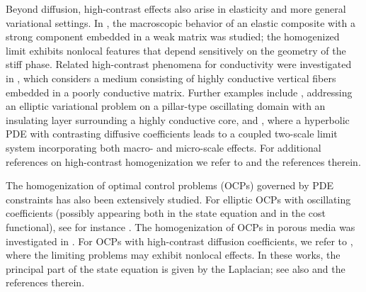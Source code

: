 \documentclass[11pt,a4paper]{article}
\numberwithin{equation}{section}
\begin{document}
Beyond diffusion, high-contrast effects also arise in elasticity and more general variational settings. In \cite{MR1952924}, the macroscopic behavior of an elastic composite with a strong component embedded in a weak matrix was studied; the homogenized limit exhibits nonlocal features that depend sensitively on the geometry of the stiff phase. Related high-contrast phenomena for conductivity were investigated in \cite{MR3000657}, which considers a medium consisting of highly conductive vertical fibers embedded in a poorly conductive matrix. Further examples include \cite{MR3342695}, addressing an elliptic variational problem on a pillar-type oscillating domain with an insulating layer surrounding a highly conductive core, and \cite{MR3450748}, where a hyperbolic PDE with contrasting diffusive coefficients leads to a coupled two-scale limit system incorporating both macro- and micro-scale effects. For additional references on high-contrast homogenization we refer to \cite{gaudiello2021limit,briane2007homogenization,MR3251918} and the references therein.

The homogenization of optimal control problems (OCPs) governed by PDE constraints has also been extensively studied. For elliptic OCPs with oscillating coefficients (possibly appearing both in the state equation and in the cost functional), see for instance \cite{MR1466916,MR451153}. The homogenization of OCPs in porous media was investigated in \cite{MR1666365}. For OCPs with high-contrast diffusion coefficients, we refer to \cite{AbuCon,MR4552077}, where the limiting problems may exhibit nonlocal effects. In these works, the principal part of the state equation is given by the Laplacian; see also \cite{MR451153,durante2010asymptotic,bidhan01} and the references therein.
\end{document}
